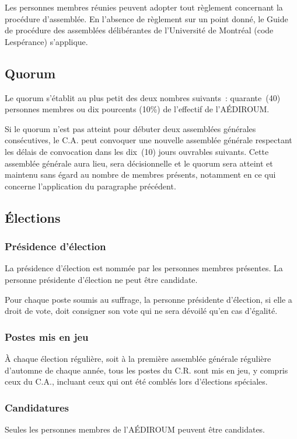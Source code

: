 \documentclass{aediroum}
\begin{document}
Les personnes membres réunies peuvent adopter tout règlement concernant la procédure d'assemblée. En l'absence de règlement sur un point donné, le Guide de procédure des assemblées délibérantes de l'Université de Montréal (code Lespérance) s'applique.

\subsection{Quorum}\label{sec:quorum}

Le quorum s'établit au plus petit des deux nombres suivants~: quarante~(40) personnes membres ou dix pourcents (10\%) de l'effectif de l'AÉDIROUM.

Si le quorum n'est pas atteint pour débuter deux assemblées générales consécutives, le C.A. peut convoquer une nouvelle assemblée générale respectant les délais de convocation dans les dix~(10) jours ouvrables suivants. Cette assemblée générale aura lieu, sera décisionnelle et le quorum sera atteint et maintenu sans égard au nombre de membres présents, notamment en ce qui concerne l'application du paragraphe précédent.

\subsection{Élections}\label{sec:elections}
\subsubsection{Présidence d'élection}\label{sec:president-delection}

La présidence d'élection est nommée par les personnes membres présentes. La personne présidente d'élection ne peut être candidate.

Pour chaque poste soumis au suffrage, la personne présidente d'élection, si elle a droit de vote, doit consigner son vote qui ne sera dévoilé qu'en cas d'égalité.

\subsubsection{Postes mis en jeu}\label{sec:postes-mis-en-jeu}
À chaque élection régulière, soit à la première assemblée générale régulière d'automne de chaque année, tous les postes du C.R. sont mis en jeu, y compris ceux du C.A., incluant ceux qui ont été comblés lors d'élections spéciales.

\subsubsection{Candidatures}\label{sec:candidatures}
Seules les personnes membres de l'AÉDIROUM peuvent être candidates.
\end{document}
